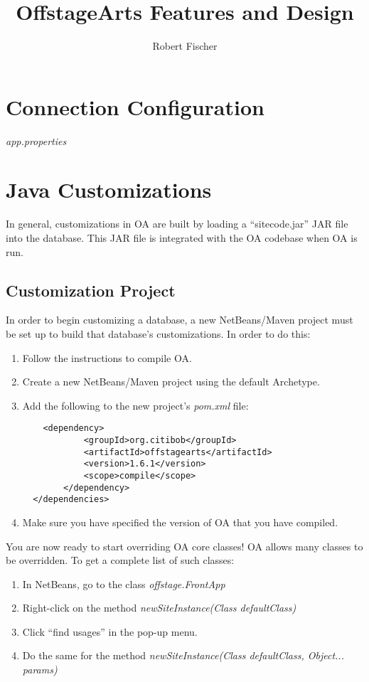 \documentclass[11pt]{article}
\title{OffstageArts Features and Design}
\author{Robert Fischer}
\begin{document}
\maketitle

\section{Connection Configuration}

\emph{app.properties}


\section{Java Customizations}

In general, customizations in OA are built by loading a ``sitecode.jar'' JAR file into the database.  This JAR file is integrated with the OA codebase when OA is run.

\subsection{Customization Project}

In order to begin customizing a database, a new NetBeans/Maven project must be set up to build that database's customizations.  In order to do this:

\begin{enumerate}
 \item Follow the instructions to compile OA.
 \item Create a new NetBeans/Maven project using the default Archetype.
 \item Add the following to the new project's \emph{pom.xml} file:
\begin{verbatim}
    <dependency>
            <groupId>org.citibob</groupId>
            <artifactId>offstagearts</artifactId>
            <version>1.6.1</version>
            <scope>compile</scope>
        </dependency>
  </dependencies>
\end{verbatim}
 \item Make sure you have specified the version of OA that you have compiled.
\end{enumerate}

You are now ready to start overriding OA core classes!  OA allows many classes to be overridden.  To get a complete list of such classes:
 \begin{enumerate}
 \item In NetBeans, go to the class \emph{offstage.FrontApp}
 \item Right-click on the method \emph{newSiteInstance(Class defaultClass)}
 \item Click ``find usages'' in the pop-up menu.
 \item Do the same for the method \emph{newSiteInstance(Class defaultClass, Object... params)}
 \end{enumerate}
\end{document}
